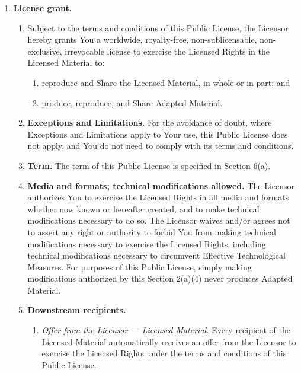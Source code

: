 \begin{enumerate}[label=(\alph*), leftmargin=1.8em, labelwidth=1.5em, align=left, itemsep=0.5em]
	\item \textbf{License grant.}
	      \begin{enumerate}[label=\arabic*., leftmargin=1.8em, labelwidth=1.2em, align=left, itemsep=0.4em]
		      \item Subject to the terms and conditions of this Public License, the Licensor hereby grants You a worldwide, royalty-free, non-sublicensable, non-exclusive, irrevocable license to exercise the Licensed Rights in the Licensed Material to:
		            \begin{enumerate}[label=(\alph*), leftmargin=1.8em, labelwidth=1.5em, align=left, itemsep=0.2em]
			            \item reproduce and Share the Licensed Material, in whole or in part; and
			            \item produce, reproduce, and Share Adapted Material.
		            \end{enumerate}
		      \item \textbf{Exceptions and Limitations.} For the avoidance of doubt, where Exceptions and Limitations apply to Your use, this Public License does not apply, and You do not need to comply with its terms and conditions.
		      \item \textbf{Term.} The term of this Public License is specified in Section 6(a).
		      \item \textbf{Media and formats; technical modifications allowed.} The Licensor authorizes You to exercise the Licensed Rights in all media and formats whether now known or hereafter created, and to make technical modifications necessary to do so. The Licensor waives and/or agrees not to assert any right or authority to forbid You from making technical modifications necessary to exercise the Licensed Rights, including technical modifications necessary to circumvent Effective Technological Measures. For purposes of this Public License, simply making modifications authorized by this Section 2(a)(4) never produces Adapted Material.
		      \item \textbf{Downstream recipients.}
		            \begin{enumerate}[label=(\alph*), leftmargin=1.8em, labelwidth=1.5em, align=left, itemsep=0.2em]
			            \item \textit{Offer from the Licensor --- Licensed Material.} Every recipient of the Licensed Material automatically receives an offer from the Licensor to exercise the Licensed Rights under the terms and conditions of this Public License.

\end{enumerate}
\end{enumerate}
\end{enumerate}
